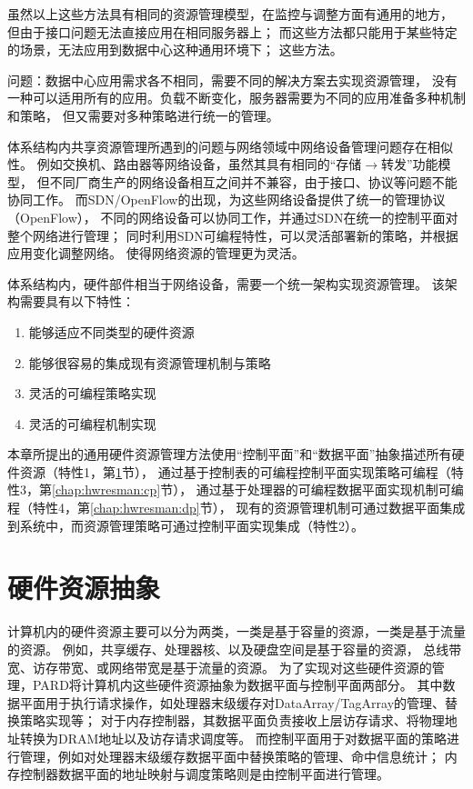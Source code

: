 虽然以上这些方法具有相同的资源管理模型，在监控与调整方面有通用的地方，
但由于接口问题无法直接应用在相同服务器上；
而这些方法都只能用于某些特定的场景，无法应用到数据中心这种通用环境下；
这些方法。

问题：数据中心应用需求各不相同，需要不同的解决方案去实现资源管理，
没有一种可以适用所有的应用。负载不断变化，服务器需要为不同的应用准备多种机制和策略，
但又需要对多种策略进行统一的管理。

体系结构内共享资源管理所遇到的问题与网络领域中网络设备管理问题存在相似性。
例如交换机、路由器等网络设备，虽然其具有相同的``存储$\rightarrow$转发''功能模型，
但不同厂商生产的网络设备相互之间并不兼容，由于接口、协议等问题不能协同工作。
而SDN/OpenFlow的出现，为这些网络设备提供了统一的管理协议（OpenFlow），
不同的网络设备可以协同工作，并通过SDN在统一的控制平面对整个网络进行管理；
同时利用SDN可编程特性，可以灵活部署新的策略，并根据应用变化调整网络。
使得网络资源的管理更为灵活。


体系结构内，硬件部件相当于网络设备，需要一个统一架构实现资源管理。
该架构需要具有以下特性：

\begin{enumerate}[{（}1{）}]
  \item 能够适应不同类型的硬件资源
  \item 能够很容易的集成现有资源管理机制与策略
  \item 灵活的可编程策略实现
  \item 灵活的可编程机制实现
\end{enumerate}

本章所提出的通用硬件资源管理方法使用``控制平面''和``数据平面''抽象描述所有硬件资源（特性1，第\ref{chap:hwresman:res}节），
通过基于控制表的可编程控制平面实现策略可编程（特性3，第\ref{chap:hwresman:cp}节），
通过基于处理器的可编程数据平面实现机制可编程（特性4，第\ref{chap:hwresman:dp}节），
现有的资源管理机制可通过数据平面集成到系统中，而资源管理策略可通过控制平面实现集成（特性2）。



\section{硬件资源抽象}
\label{chap:hwresman:res}

计算机内的硬件资源主要可以分为两类，一类是基于容量的资源，一类是基于流量的资源。
例如，共享缓存、处理器核、以及硬盘空间是基于容量的资源，
总线带宽、访存带宽、或网络带宽是基于流量的资源。
为了实现对这些硬件资源的管理，PARD将计算机内这些硬件资源抽象为数据平面与控制平面两部分。
其中数据平面用于执行请求操作，如处理器末级缓存对DataArray/TagArray的管理、替换策略实现等；
对于内存控制器，其数据平面负责接收上层访存请求、将物理地址转换为DRAM地址以及访存请求调度等。
而控制平面用于对数据平面的策略进行管理，例如对处理器末级缓存数据平面中替换策略的管理、命中信息统计；
内存控制器数据平面的地址映射与调度策略则是由控制平面进行管理。

